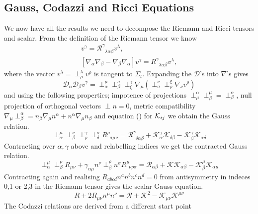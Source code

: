 \subsection{Gauss, Codazzi and Ricci Equations}
We now have all the results we need to decompose the Riemann and Ricci tensors and scalar. From the definition of the Riemann tensor we know
\begin{gather*} [\mathcal{D}_\alpha\mathcal{D}_\beta-\mathcal{D}_\beta\mathcal{D}_\alpha]v^\gamma = \mathcal{R}^\gamma_{\,\,\,\lambda \alpha\beta}v^\lambda, \\
 [\nabla_\alpha\nabla_\beta-\nabla_\beta\nabla_\alpha]v^\gamma = {R}^\gamma_{\,\,\,\lambda \alpha\beta}v^\lambda, \end{gather*}
where the vector $v^\lambda = \perp^\lambda_\rho v^\rho$ is tangent to $\Sigma_t$. Expanding the $\mathcal{D}$'s into $\nabla$'s gives
\[ \mathcal{D}_\alpha \mathcal{D}_\beta v^\gamma = \perp^\mu_\alpha \perp_\beta^\sigma \perp^\gamma_\xi \nabla_\mu(\perp^\nu_\sigma \perp^\xi_\rho \nabla_\nu v^\rho)\]
and using the following properties; impotence of projections $\perp^\alpha_\mu \perp^\mu_\beta = \perp^\alpha_\beta$, null projection of orthogonal vectors $\perp n =0$, metric compatibility $\nabla_\mu \perp^\alpha_\beta = n_\beta\nabla_\mu n^\alpha + n^\alpha \nabla_\mu n_\beta$ and equation () for $\mathcal{K}_{ij}$ we obtain the Gauss relation.
\begin{equation} \perp^\mu_\alpha \perp^\nu_\beta \perp^\gamma_\rho \perp^\sigma_\delta R^{\rho}_{\,\,\,\sigma\mu\nu} = \mathcal{R}^\gamma_{\,\,\,\delta\alpha\beta} + \mathcal{K}^\gamma_\alpha \mathcal{K}_{\delta\beta} - \mathcal{K}^\gamma_\beta \mathcal{K}_{\alpha\delta}  \end{equation}
Contracting over $\alpha,\gamma$ above and relabelling indices we get the contracted Gauss relation.
\begin{equation} \perp^\mu_\alpha \perp^\nu_\beta R_{\mu\nu} + \gamma_{\alpha\mu}n^\nu\perp^\rho_\beta n^\sigma R^\mu_{\,\,\,\nu\rho\sigma} = \mathcal{R}_{\alpha\beta} + \mathcal{K} \mathcal{K}_{\alpha\beta} - \mathcal{K}^\mu_\beta \mathcal{K}_{\alpha\mu}  \end{equation}
Contracting again and realising $R_{abcd}n^an^bn^cn^d=0$ from antisymmetry in indeces 0,1 or 2,3 in the Riemann tensor gives the scalar Gauss equation.
\begin{equation}R + 2R_{\mu\nu}n^\mu n^\nu = \mathcal{R} + \mathcal{K}^2 - \mathcal{K}_{\mu\nu}\mathcal{K}^{\mu\nu}\end{equation}
The Codazzi relations are derived from a different start point
